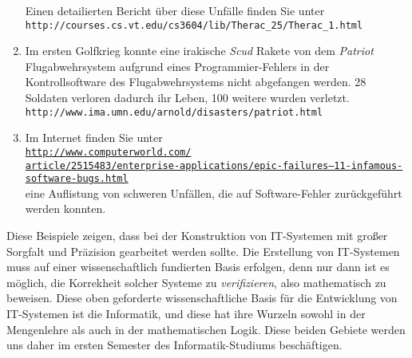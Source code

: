 \begin{enumerate}
      Einen detailierten Bericht über diese Unfälle finden Sie unter \\[0.1cm]
      \hspace*{1.3cm} \texttt{http://courses.cs.vt.edu/cs3604/lib/Therac\_25/Therac\_1.html}      
\item Im ersten Golfkrieg konnte eine irakische \textsl{Scud} Rakete von dem \textsl{Patriot} Flugabwehrsystem
      aufgrund eines Programmier-Fehlers in der Kontrollsoftware des Flugabwehrsystems
      nicht abgefangen werden.  28 Soldaten verloren dadurch ihr Leben, 100 weitere wurden
      verletzt. \\[0.1cm]
      \hspace*{1.3cm} \texttt{http://www.ima.umn.edu/arnold/disasters/patriot.html}
\item Im Internet finden Sie unter \\[0.1cm]
      \hspace*{1.3cm}
      \href{http://www.computerworld.com/article/2515483/enterprise-applications/epic-failures--11-infamous-software-bugs.html}{\texttt{http://www.computerworld.com/\\
              article/2515483/enterprise-applications/epic-failures--11-infamous-software-bugs.html}}
      \\[0.1cm]
      eine Auflistung von schweren Unfällen, die auf Software-Fehler zurückgeführt werden konnten.
\end{enumerate}
Diese Beispiele zeigen, dass bei der Konstruktion von IT-Systemen mit großer Sorgfalt
und Präzision gearbeitet werden sollte.  Die Erstellung von IT-Systemen muss auf einer 
wissenschaftlich fundierten Basis erfolgen, denn nur dann ist es möglich, die Korrekheit
solcher Systeme zu \emph{verifizieren}, also mathematisch zu beweisen.
Diese oben geforderte wissenschaftliche Basis für die Entwicklung von IT-Systemen ist die Informatik, 
und diese hat ihre Wurzeln sowohl in der Mengenlehre als auch in der mathematischen
Logik.  Diese beiden Gebiete werden uns daher im ersten Semester
des Informatik-Studiums beschäftigen.

